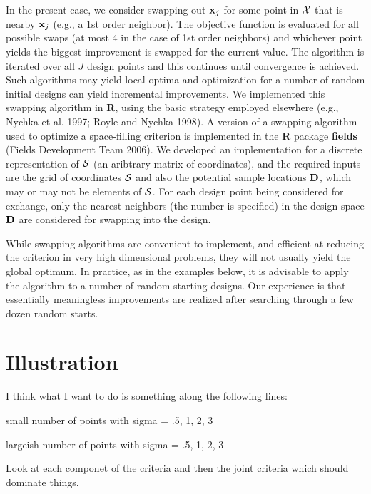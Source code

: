 \documentclass[useAMS,referee]{biom}
\begin{document}
In the present case, we consider swapping out ${\bf x}_{j}$ for some
point in ${\cal X}$ that is nearby ${\bf x}_{j}$ (e.g., a 1st order
neighbor). The objective function is evaluated for all possible swaps
(at most 4 in the case of 1st order neighbors) and whichever point
yields the biggest improvement is swapped for the current value.  The
algorithm is iterated over all $J$ design points and this continues
until convergence is achieved. Such algorithms may yield local optima
and optimization for a number of random initial designs can yield
incremental improvements. We implemented this swapping algorithm in
{\bf R}, using the basic strategy employed elsewhere (e.g., Nychka et
al. 1997; Royle and Nychka 1998).  A version of a swapping
algorithm used to optimize a space-filling criterion is implemented
in the {\bf R} package {\bf
  fields} (Fields Development Team 2006).  We developed an
  implementation for
a discrete representation of ${\cal S}$ (an aribtrary matrix of
coordinates), and the required inputs are the grid of coordinates
${\cal S}$ and also the potential sample locations ${\bf D}$, which
may or may not be elements of ${\cal S}$. 
For each design point being considered for exchange, only 
the nearest neighbors (the number is specified) in the design space
${\bf D}$ are  considered for
swapping into the design.

While swapping algorithms are convenient to implement, and efficient
at reducing the criterion in very high dimensional problems, they will
not usually yield the global optimum.  In practice, as in the examples
below, it is advisable to apply the algorithm to a number of
random starting designs. Our experience is that essentially
meaningless improvements are realized after searching through a few
dozen random starts.


\section{Illustration}

I think what I want to do is something along the following lines:

 small number of points with sigma = .5, 1, 2, 3

 largeish number of points with sigma = .5, 1, 2, 3

Look at each componet of the criteria and then the joint criteria
which should dominate things.
\end{document}
